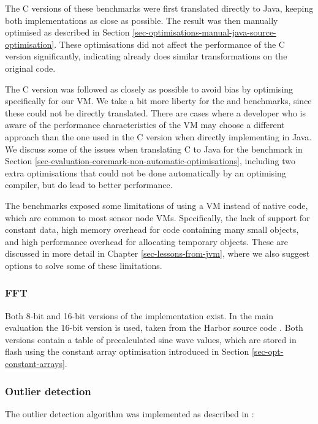 The C versions of these benchmarks were first translated directly to Java, keeping both implementations as close as possible. The result was then manually optimised as described in Section \ref{sec-optimisations-manual-java-source-optimisation}. These optimisations did not affect the performance of the C version significantly, indicating  already does similar transformations on the original code.

The C version was followed as closely as possible to avoid bias by optimising specifically for our VM. We take a bit more liberty for the  and  benchmarks, since these could not be directly translated. There are cases where a developer who is aware of the performance characteristics of the VM may choose a different approach than the one used in the C version when directly implementing in Java. We discuss some of the issues when translating C to Java for the  benchmark in Section \ref{sec-evaluation-coremark-non-automatic-optimisations}, including two extra optimisations that could not be done automatically by an optimising compiler, but do lead to better performance.

The benchmarks exposed some limitations of using a VM instead of native code, which are common to most sensor node VMs. Specifically, the lack of support for constant data, high memory overhead for code containing many small objects, and high performance overhead for allocating temporary objects. These are discussed in more detail in Chapter \ref{sec-lessons-from-jvm}, where we also suggest options to solve some of these limitations.

\subsubsection{FFT}
Both 8-bit and 16-bit versions of the  implementation exist. In the main evaluation the 16-bit version is used, taken from the Harbor source code \cite{sos-operating-system}. Both versions contain a table of precalculated sine wave values, which are stored in flash using the constant array optimisation introduced in Section \ref{sec-opt-constant-arrays}.

\subsubsection{Outlier detection}
The outlier detection algorithm was implemented as described in \cite{Kumar:2007ge}:

